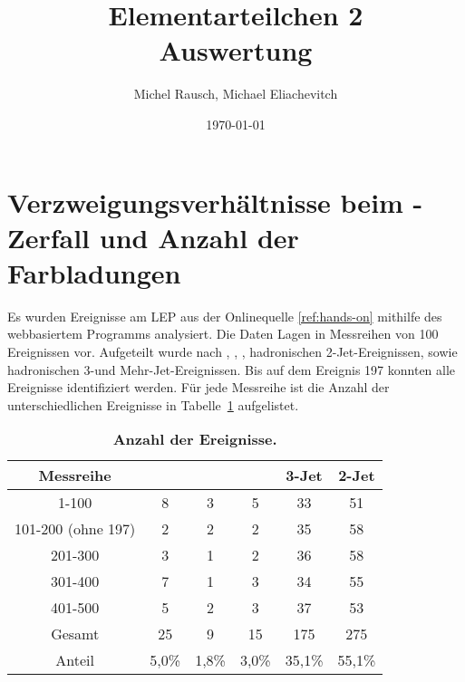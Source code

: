 \documentclass[a4paper,ngerman]{scrartcl}
\title{Elementarteilchen 2\\Auswertung}
\date{\today}
\author{Michel Rausch, Michael Eliachevitch}
\begin{document}
\maketitle
\tableofcontents
\newpage


\section{Verzweigungsverhältnisse beim \PZzero-Zerfall und Anzahl der Farbladungen}
\label{sec:verzweigungen}

Es wurden Ereignisse am LEP aus der Onlinequelle \ref{ref:hands-on} mithilfe des webbasiertem Programms analysiert.
Die Daten Lagen in Messreihen von 100 Ereignissen vor.
Aufgeteilt wurde nach \Pelectron\APelectron ,	\Ptauon\APtauon	,	\Pmuon\APmuon , hadronischen 2-Jet-Ereignissen, sowie hadronischen 3-und Mehr-Jet-Ereignissen.
Bis auf dem Ereignis 197 konnten alle Ereignisse identifiziert werden.
Für jede Messreihe ist die Anzahl der unterschiedlichen Ereignisse in Tabelle~\ref{tab:count} aufgelistet.


\begin{table}
\centering
\caption{\textbf{Anzahl der Ereignisse.}}
\begin{tabular}{cccccc}
\toprule
Messreihe			&	\Pelectron\APelectron	&	\Ptauon\APtauon	&	\Pmuon\APmuon	&	3-Jet	&	2-Jet	\\
\midrule
1-100				& 	8	&	3	&	5	&	33	&	51	\\
101-200 (ohne 197)	& 	2	&	2	&	2	&	35	&	58	\\
201-300				&	3	&	1	&	2	&	36	&	58	\\
301-400				&	7	&	1	&	3	&	34	&	55	\\
401-500				&	5	&	2	&	3	&	37	&	53	\\
Gesamt				&	25	&	9	&	15	&	175	&	275	\\
Anteil				&5,0\%	&1,8\%  &3,0\%	&35,1\%	&55,1\%	\\
\bottomrule
\end{tabular}
\label{tab:count}
\end{table}
\end{document}
